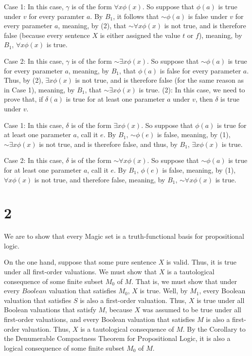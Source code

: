 \documentclass{article}
\newcommand*{\oldneg}{\mathord{\sim}}
\theoremstyle{definition}
\begin{document}
Case 1: In this case, $\gamma$ is of the form $\forall x\phi(x)$. So suppose that $\phi(a)$ is true under $v$ for every paramter $a$. By $B_1$, 
it follows that $\oldneg\phi(a)$ is false under $v$ for every parameter $a$, meaning, by (2), that $\oldneg\forall x\phi(x)$ is not true, and is 
therefore false (because every sentence $X$ is either assigned the value $t$ or $f$), meaning, by $B_1$, $\forall x\phi(x)$ is true.\newline


Case 2: In this case, $\gamma$ is of the form $\oldneg\exists x\phi(x)$. So suppose that $\oldneg\phi(a)$ is true for every parameter $a$, meaning, 
by $B_1$, that $\phi(a)$ is false for every parameter $a$. Thus, by (2), $\exists x\phi(x)$ is not true, and is therefore false (for the same reason 
as in Case 1), meaning, by $B_1$, that $\oldneg\exists x\phi(x)$ is true.\newline\newline
(2): In this case, we need to prove that, if $\delta(a)$ is true for at least one parameter $a$ under $v$, then $\delta$ is true under $v$.


Case 1: In this case, $\delta$ is of the form $\exists x\phi(x)$. So suppose that $\phi(a)$ is true for at least one parameter $a$, call it $e$. 
By $B_1$, $\oldneg\phi(e)$ is false, meaning, by (1), $\oldneg\exists x\phi(x)$ is not true, and is therefore false, and thus, by $B_1$, 
$\exists x\phi(x)$ is true.\newline 


Case 2: In this case, $\delta$ is of the form $\oldneg\forall x\phi(x)$. So suppose that $\oldneg\phi(a)$ is true for at least one parameter $a$, call 
it $e$. By $B_1$, $\phi(e)$ is false, meaning, by (1), $\forall x\phi(x)$ is not true, and therefore false, meaning, by $B_1$, $\oldneg\forall x\phi(x)$
is true.  

\section*{2}
We are to show that every Magic set is a truth-functional basis for propositional logic.


On the one hand, suppose that some pure sentence $X$ is valid. Thus, it is true under all first-order valuations. We must show that $X$ is a tautological consequence of some finite subset $M_0$ of $M$. That is, we must show that under every $Boolean$ valuation 
that satisfies $M_0$, $X$ is true. Well, by $M_1$, every Boolean valuation that satisfies $S$ is also a first-order valuation. 
Thus, $X$ is true under all Boolean valuations that satisfy $M$, because $X$ was assumed to be true under all first-order 
valuations, and every Boolean valuation that satisfies $M$ is also a first-order valuation. Thus, $X$ is a tautological 
consequence of $M$. By the Corollary to the Denumerable Compactness Theorem for Propositional Logic, it is also a logical 
consequence of some finite subset $M_0$ of $M$.
\end{document}
